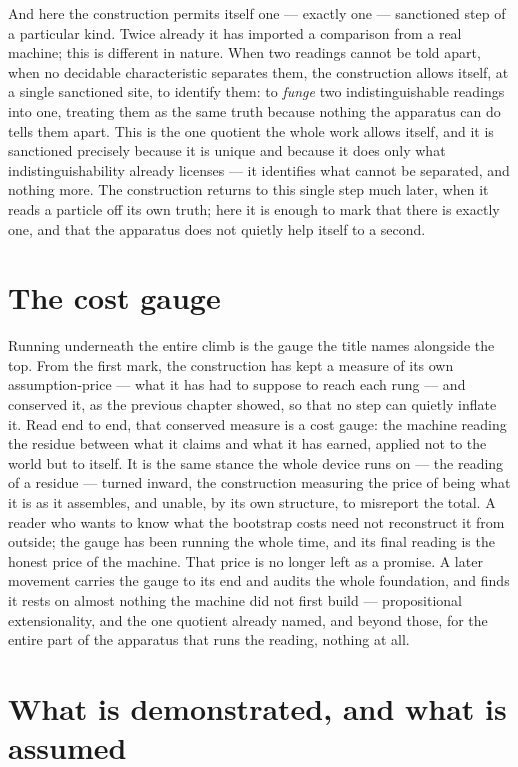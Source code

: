 And here the construction permits itself one --- exactly one --- sanctioned step of a particular kind.
Twice already it has imported a comparison from a real machine; this is different in nature. When two
readings cannot be told apart, when no decidable characteristic separates them, the construction allows
itself, at a single sanctioned site, to identify them: to \emph{funge} two indistinguishable readings into
one, treating them as the same truth because nothing the apparatus can do tells them apart. This is the one
quotient the whole work allows itself, and it is sanctioned precisely because it is unique and because it
does only what indistinguishability already licenses --- it identifies what cannot be separated, and
nothing more. The construction returns to this single step much later, when it reads a particle off its own
truth; here it is enough to mark that there is exactly one, and that the apparatus does not quietly help
itself to a second.

\section{The cost gauge}
\label{se:the-cost-gauge}

Running underneath the entire climb is the gauge the title names alongside the top. From the first mark,
the construction has kept a measure of its own assumption-price --- what it has had to suppose to reach
each rung --- and conserved it, as the previous chapter showed, so that no step can quietly inflate it.
Read end to end, that conserved measure is a cost gauge: the machine reading the residue between what it
claims and what it has earned, applied not to the world but to itself. It is the same stance the whole
device runs on --- the reading of a residue --- turned inward, the construction measuring the price of
being what it is as it assembles, and unable, by its own structure, to misreport the total. A reader who
wants to know what the bootstrap costs need not reconstruct it from outside; the gauge has been running the
whole time, and its final reading is the honest price of the machine. That price is no longer left as a
promise. A later movement carries the gauge to its end and audits the whole foundation, and finds it rests
on almost nothing the machine did not first build --- propositional extensionality, and the one quotient
already named, and beyond those, for the entire part of the apparatus that runs the reading, nothing at
all.

\section{What is demonstrated, and what is assumed}
\label{se:demonstrated-assumed-I5}

